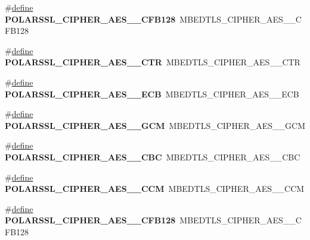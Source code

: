 \begin{DoxyCompactItemize}
\#\hyperlink{structdefine}{define} {\bfseries P\+O\+L\+A\+R\+S\+S\+L\+\_\+\+C\+I\+P\+H\+E\+R\+\_\+\+A\+E\+S\+\_\+\_\+\+C\+F\+B128}~M\+B\+E\+D\+T\+L\+S\+\_\+\+C\+I\+P\+H\+E\+R\+\_\+\+A\+E\+S\+\_\+\_\+\+C\+F\+B128
\item 
\mbox{\label{compat-1_83_8h_a5d784fe8cdb0ef71f9784b8de02a16be}} 
\#\hyperlink{structdefine}{define} {\bfseries P\+O\+L\+A\+R\+S\+S\+L\+\_\+\+C\+I\+P\+H\+E\+R\+\_\+\+A\+E\+S\+\_\+\_\+\+C\+TR}~M\+B\+E\+D\+T\+L\+S\+\_\+\+C\+I\+P\+H\+E\+R\+\_\+\+A\+E\+S\+\_\+\_\+\+C\+TR
\item 
\mbox{\label{compat-1_83_8h_aa4d8ecbb89ebde454341b107b354203a}} 
\#\hyperlink{structdefine}{define} {\bfseries P\+O\+L\+A\+R\+S\+S\+L\+\_\+\+C\+I\+P\+H\+E\+R\+\_\+\+A\+E\+S\+\_\+\_\+\+E\+CB}~M\+B\+E\+D\+T\+L\+S\+\_\+\+C\+I\+P\+H\+E\+R\+\_\+\+A\+E\+S\+\_\+\_\+\+E\+CB
\item 
\mbox{\label{compat-1_83_8h_a6e5af502e114bef894e65128c80c17d3}} 
\#\hyperlink{structdefine}{define} {\bfseries P\+O\+L\+A\+R\+S\+S\+L\+\_\+\+C\+I\+P\+H\+E\+R\+\_\+\+A\+E\+S\+\_\+\_\+\+G\+CM}~M\+B\+E\+D\+T\+L\+S\+\_\+\+C\+I\+P\+H\+E\+R\+\_\+\+A\+E\+S\+\_\+\_\+\+G\+CM
\item 
\mbox{\label{compat-1_83_8h_a808505b2a873d08c22bfbc4d31c01c8a}} 
\#\hyperlink{structdefine}{define} {\bfseries P\+O\+L\+A\+R\+S\+S\+L\+\_\+\+C\+I\+P\+H\+E\+R\+\_\+\+A\+E\+S\+\_\+\_\+\+C\+BC}~M\+B\+E\+D\+T\+L\+S\+\_\+\+C\+I\+P\+H\+E\+R\+\_\+\+A\+E\+S\+\_\+\_\+\+C\+BC
\item 
\mbox{\label{compat-1_83_8h_a0cdcabb7844db61e1eedea27a402926b}} 
\#\hyperlink{structdefine}{define} {\bfseries P\+O\+L\+A\+R\+S\+S\+L\+\_\+\+C\+I\+P\+H\+E\+R\+\_\+\+A\+E\+S\+\_\+\_\+\+C\+CM}~M\+B\+E\+D\+T\+L\+S\+\_\+\+C\+I\+P\+H\+E\+R\+\_\+\+A\+E\+S\+\_\+\_\+\+C\+CM
\item 
\mbox{\label{compat-1_83_8h_ac22c7fb93553cc623ae26e3549f5d7e2}} 
\#\hyperlink{structdefine}{define} {\bfseries P\+O\+L\+A\+R\+S\+S\+L\+\_\+\+C\+I\+P\+H\+E\+R\+\_\+\+A\+E\+S\+\_\+\_\+\+C\+F\+B128}~M\+B\+E\+D\+T\+L\+S\+\_\+\+C\+I\+P\+H\+E\+R\+\_\+\+A\+E\+S\+\_\+\_\+\+C\+F\+B128
\item 
\mbox{\label{compat-1_83_8h_a49453b800a493de9ba2945d1ea22df43}} 

\end{DoxyCompactItemize}
